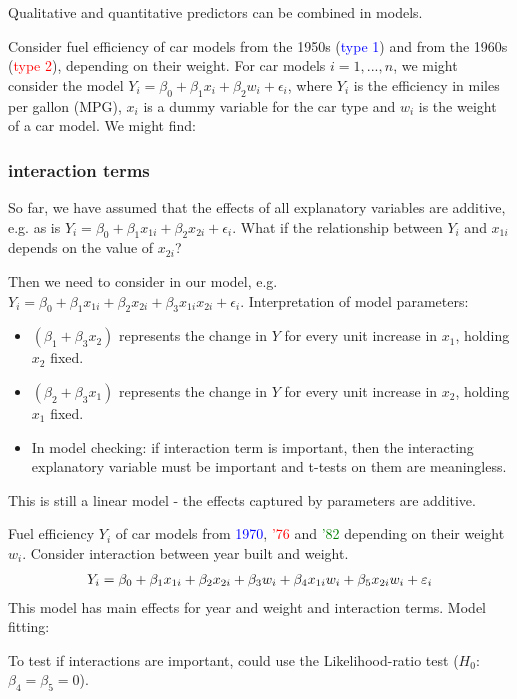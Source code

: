 Qualitative and quantitative predictors can be combined in models.

\begin{example}
	Consider fuel efficiency of car models from the 1950s (\textcolor{blue}{type 1}) and from the 1960s (\textcolor{red}{type 2}), depending on their weight. For car models $i=1,...,n$, we might consider the model $Y_i = \beta_0 + \beta_1x_i + \beta_2w_i + \epsilon_i$, where $Y_i$ is the efficiency in miles per gallon (MPG), $x_i$ is a dummy variable for the car type and $w_i$ is the weight of a car model. We might find:
	
\end{example}

\subsubsection{interaction terms}

So far, we have assumed that the effects of all explanatory variables are additive, e.g. as is $Y_i = \beta_0 + \beta_1x_{1i} + \beta_2x_{2i} + \epsilon_i$. What if the relationship between $Y_i$ and $x_{1i}$ depends on the value of $x_{2i}$? 

Then we need to consider  in our model, e.g. $Y_i = \beta_0 + \beta_1x_{1i} + \beta_2x_{2i} + \beta_3x_{1i}x_{2i} + \epsilon_i$. Interpretation of model parameters:
\begin{itemize}
	\item $(\beta_1 + \beta_3x_2)$ represents the change in $Y$ for every unit increase in $x_1$, holding $x_2$ fixed.
	\item $(\beta_2 + \beta_3x_1)$ represents the change in $Y$ for every unit increase in $x_2$, holding $x_1$ fixed.
	\item In model checking: if interaction term is important, then the interacting explanatory variable must be important and t-tests on them are meaningless.
\end{itemize}

This is still a linear model - the effects captured by parameters are additive.

\begin{example}
	Fuel efficiency $Y_i$ of car models from \textcolor{blue}{1970}, \textcolor{red}{'76} and \textcolor{green}{'82} depending on their weight $w_i$. Consider interaction between year built and weight.
	\begin{align}
		Y_i = \beta_0 + \beta_1x_{1i} + \beta_2x_{2i} + \beta_3w_i + \beta_4x_{1i}w_i + \beta_5x_{2i}w_i + \epsilon_i\notag
	\end{align}
	This model has main effects for year and weight and interaction terms. Model fitting:
	
	To test if interactions are important, could use the Likelihood-ratio test ($H_0$: $\beta_4=\beta_5=0$).
\end{example}


